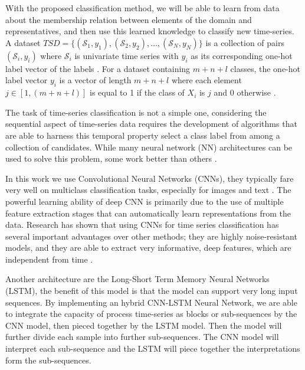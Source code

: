 With the proposed classification method, we will be able to learn from data about the membership relation between elements of the domain and representatives, and then use this learned knowledge to classify new time-series. A dataset $TSD=\{(\mathcal{S}_1,y_1),(\mathcal{S}_2,y_2), \ldots ,(\mathcal{S}_N,y_N)\}$ is a collection of pairs $(\mathcal{S}_i,y_i)$ where $\mathcal{S}_i$ is univariate time series with $y_i$ as its corresponding one-hot label vector of the labels \cite{Gulli2017}. For a dataset containing $m+n+l$ classes, the one-hot label vector $y_i$ is a vector of length $m+n+l$ where each element $j \in [1,(m+n+l)]$ is equal to 1 if the class of $X_i$ is $j$ and $0$ otherwise \cite{Mitsa2010}.

The task of time-series classification is not a simple one, considering the sequential aspect of time-series data requires the development of algorithms that are able to harness this temporal property select a class label from among a collection of candidates. While many neural network (NN) architectures can be used to solve this problem, some work better than others \cite{Bagnall2017a}. 

In this work we use Convolutional Neural Networks (CNNs), they typically fare very well on multiclass classification tasks, especially for images and text \cite{Goodfellow2016}. The powerful learning ability of deep CNN is primarily due to the use of multiple feature extraction stages that can automatically learn representations from the data. Research has shown that using CNNs for time series classification has several important advantages over other methods; they are highly noise-resistant models, and they are able to extract very informative, deep features, which are independent from time \cite{Wang2016, Bagnall2017a, Zhao2017}.

Another architecture are the Long-Short Term Memory Neural Networks (LSTM), the benefit of this model is that the model can support very long input sequences. By implementing an hybrid CNN-LSTM Neural Network, we are able to integrate the capacity of process time-series as blocks or sub-sequences by the CNN model, then pieced together by the LSTM model. Then the model will further divide each sample into further sub-sequences. The CNN model will interpret each sub-sequence and the LSTM will piece together the interpretations form the sub-sequences. 

